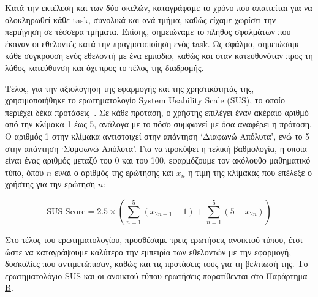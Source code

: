 Κατά την εκτέλεση και των δύο σκελών, καταγράφαμε το χρόνο που απαιτείται για να ολοκληρωθεί κάθε task, συνολικά και ανά τμήμα, καθώς είχαμε χωρίσει την περιήγηση σε τέσσερα τμήματα. Επίσης, σημειώναμε το πλήθος σφαλμάτων που έκαναν οι εθελοντές κατά την πραγματοποίηση ενός task. Ως σφάλμα, σημειώσαμε κάθε σύγκρουση ενός εθελοντή με ένα εμπόδιο, καθώς και όταν κατευθυνόταν προς τη λάθος κατεύθυνση και όχι προς το τέλος της διαδρομής.

Τέλος, για την αξιολόγηση της εφαρμογής και της χρηστικότητάς της, χρησιμοποιήθηκε το ερωτηματολογίο System Usability Scale (SUS), το οποίο περιέχει δέκα προτάσεις~\cite{brooke_1995_sus}. Σε κάθε πρόταση, ο χρήστης επιλέγει έναν ακέραιο αριθμό από την κλίμακα 1 έως 5, ανάλογα με το πόσο συμφωνεί με όσα αναφέρει η πρόταση. Ο αριθμός 1 στην κλίμακα αντιστοιχεί στην απάντηση `Διαφωνώ Απόλυτα', ενώ το 5 στην απάντηση `Συμφωνώ Απόλυτα'. Για να προκύψει η τελική βαθμολογία, η οποία είναι ένας αριθμός μεταξύ του 0 και του 100, εφαρμόζουμε τον ακόλουθο μαθηματικό τύπο, όπου $n$ είναι ο αριθμός της ερώτησης και $x_n$ η τιμή της κλίμακας που επέλεξε ο χρήστης για την ερώτηση $n$:

\[
  \text{SUS Score} = 2.5 \times ( \sum_{n=1}^{5}(x_{2n - 1} - 1) + \sum_{n=1}^{5}(5 - x_{2n}))
\]

Στο τέλος του ερωτηματολογίου, προσθέσαμε τρεις ερωτήσεις ανοικτού τύπου, έτσι ώστε να καταγράψουμε καλύτερα την εμπειρία των εθελοντών με την εφαρμογή, δυσκολίες που αντιμετώπισαν, καθώς και τις προτάσεις τους για τη βελτίωσή της. Το ερωτηματολόγιο SUS και οι ανοικτού τύπου ερωτήσεις παρατίθενται στο \hyperref[ch:appendixB]{Παράρτημα Β}.

